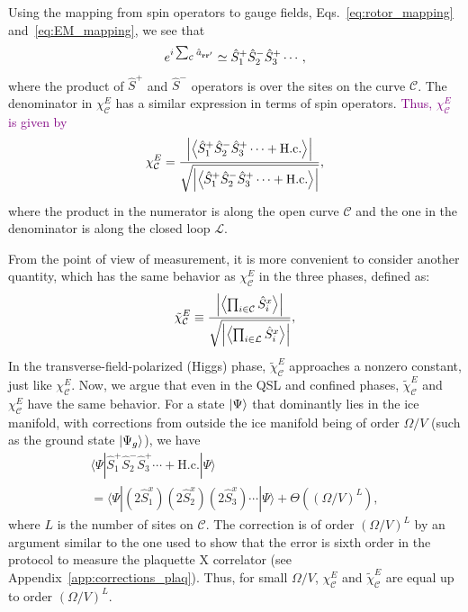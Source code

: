 \documentclass[twocolumn,superscriptaddress,amsmath,amssymb,aps,prx,nofootinbib]{revtex4-2}
\newcommand{\newtext}[1]{\textcolor{purple}{#1}}
\begin{document}
Using the mapping from spin operators to gauge fields, Eqs.~\eqref{eq:rotor_mapping} and~\eqref{eq:EM_mapping}, we see that
\begin{equation} 
   e^{i\sum_\mathcal{C} \hat{a}_{\vb{r} \vb{r}'}} \simeq \hat{S}_1^+\hat{S}_2^-\hat{S}_3^+\cdots,
\end{equation}
where the product of $\hat{S}^+$ and $ \hat{S}^-$ operators is over the sites on the curve $\mathcal{C}$.
The denominator in $\chi_{\mathcal{C}}^E$ has a similar expression in terms of spin operators. \newtext{Thus, $\chi_{\mathcal{C}}^{E}$ is given by}
\begin{equation}\label{eq:FM_e_plus_minus}
      \chi_{\mathcal{C}}^E = \frac{\abs{ \expval{ \hat{S}_1^+\hat{S}_2^-\hat{S}_3^+\cdots +\text{H.c.} } } }{\sqrt{ \abs{ \expval{ \hat{S}_1^+\hat{S}_2^-\hat{S}_3^+\cdots + \text{H.c.} }  }}},
\end{equation}
where the product in the numerator is along the open curve $\mathcal{C}$ and the one in the denominator is along the closed loop $\mathcal{L}$.

From the point of view of measurement, it is more convenient to consider another quantity,  which has the same behavior as $\chi_\mathcal{C}^E$ in the three phases, defined as:
\begin{equation}
\tilde{\chi}_\mathcal{C}^E \equiv \frac{\abs{ \expval{ \prod_{i\in \mathcal{C}} \hat{S}_i^x  } } }{\sqrt{ \abs{ \expval{ \prod_{i\in \mathcal{L}} \hat{S}_i^x  }  }}},
\end{equation}
In the transverse-field-polarized (Higgs) phase, $\tilde{\chi}_\mathcal{C}^E$ approaches a nonzero constant, just like $\chi_\mathcal{C}^E$. Now, we argue that even in the QSL and confined phases, $\tilde{\chi}_\mathcal{C}^E$ and $\chi_\mathcal{C}^E$ have the same behavior.  
For a state $\ket{\Psi} $ that dominantly lies in the ice manifold, with corrections from outside the ice manifold being of order $\Omega/V$ (such as the ground state $\ket{\Psi_g}$),  we have
\begin{multline}
  \langle \Psi | \hat{S}_1^+ \hat{S}_2^- \hat{S}_3^+ \cdots + \text{H.c.} | \Psi \rangle \\ = \langle \Psi | (2\hat{S}_1^x) (2\hat{S}_2^x) (2\hat{S}_3^x) \cdots |\Psi \rangle + \Theta \left( (\Omega/V)^L \right),
\end{multline}
where $L$ is the number of sites on $\mathcal{C}$. The correction is of order $( \Omega/V )^L$ by an argument similar to the one used to show that the error is sixth order in the protocol to measure the plaquette X correlator (see Appendix~\ref{app:corrections_plaq}). Thus, for small $\Omega/V$, $\chi_\mathcal{C}^E$ and $\tilde{\chi}_\mathcal{C}^E$ are equal up to order $(\Omega/V)^L$. 
\end{document}
